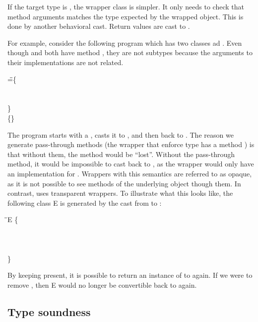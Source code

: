 \documentclass[USenglish]{tex/lipics-v2016}
\begin{document}
If the target type is \any, the wrapper class is simpler. It only needs to
check that method arguments matches the type expected by the wrapped
object. This is done by another behavioral cast. Return values are cast to
\any.

For example, consider the following program which has two classes \C ad \D.
Even though \C and \D both have method \a, they are not subtypes because the
arguments to their \m implementations are not related.

\begin{tabbing}\small
\hspace{1cm}
 \HS\HS\HS\WHERE\HS
  \K\HS =\HS \= \class\= \C \{\\
       \> \HS \Mdef\m\x\any\any{\HS\x\HS}\\
       \> \HS \Mdef\n\x\any\any{\HS\x\HS}\\
       \> \}  \\
       \>\class \D \{\HS \Mdef\m\x\Int\Int{\HS\x\HS}\HS \}
\end{tabbing}

\noindent
The program starts with a \C, casts it to \D, and then back to \C. The
reason we generate pass-through methods (the wrapper that enforce type \D
has a method \n) is that without them, the method \n would be ``lost''. 
Without the pass-through method, it would be impossible to cast back to
\C, as the wrapper would only have an implementation for \m. Wrappers
with this semantics are referred to as opaque, as it is not possible
to see methods of the underlying object though them. In contrast,
\kafka uses transparent wrappers.
To illustrate what this looks like, the following class \xt E is generated
by the cast from \C to \D:

\begin{tabbing}\small
\HS\HS\=\class\= \xt E \{\\
\>\> \HS \Fdef\that\C \\
\>\> \HS \Mdef\m\x\Int\Int{\HS\BehCast\Int{\KCall\that\m{\BehCast\any\x}\any\any\HS}} \\ 
\>\> \HS \Mdef\n\x\any\any{\HS \KCall\that\n{\x}\any\any\HS} \\ 
\>\}
\end{tabbing}

\noindent
By keeping \n present, it is possible to return an instance of
\E to \C again. If we were to remove \n, then \xt E would no longer
be convertible back to \C again.    

\subsection{Type soundness}
\end{document}
